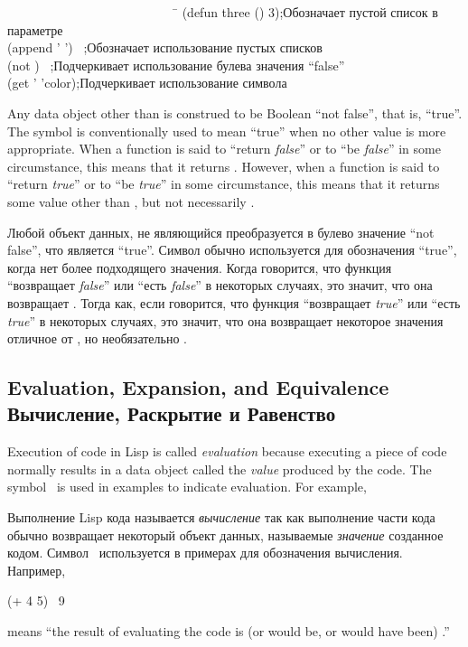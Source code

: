 \begin{lisp}
~~~~~~~~~~~~~~~~~~~~~~~~~~~\=\kill
(defun three () 3)\>;{\rm Обозначает пустой список в параметре} \\
(append '{\empty} '{\empty}) \EV\ {\empty}\>;{\rm Обозначает использование
пустых списков} \\
(not {\false}) \EV\ {\true}\>;{\rm Подчеркивает использование булева значения ``false''} \\
(get '{\nil} 'color)\>;{\rm Подчеркивает использование символа}
\end{lisp}

Any data object other than {\false} is construed to be Boolean
``not false'', that is, ``true''.  The symbol {\true} is conventionally
used to mean ``true'' when no other value is more appropriate.
When a function is said to ``return {\it false}'' or to ``be {\it false}''
in some circumstance, this means that it returns {\false}.
However, when a function is said to ``return {\it true}'' or to ``be {\it true}''
in some circumstance, this means that it returns some value other
than {\false}, but not necessarily {\true}.

Любой объект данных, не являющийся {\false} преобразуется в булево значение
``not false'', что является ``true''. Символ {\true} обычно используется для
обозначения ``true'', когда нет более подходящего значения.
Когда говорится, что функция ``возвращает {\it false}'' или ``есть {\it false}''
в некоторых случаях, это значит, что она возвращает {\false}.
Тогда как, если говорится, что функция ``возвращает {\it true}'' или ``есть {\it
true}'' в некоторых случаях, это значит, что она возвращает некоторое
значения отличное от {\false}, но необязательно {\true}.

\subsection{Evaluation, Expansion, and Equivalence Вычисление, Раскрытие и Равенство}

Execution of code in Lisp is called {\it evaluation} because executing a
piece of code normally results in a data object called the {\it value}
produced by the code.  The symbol \EV\ is used in examples to
indicate evaluation.
For example,

Выполнение Lisp кода называется {\it вычисление} так как выполнение части кода
обычно возвращает некоторый объект данных, называемые {\it значение} созданное
кодом. Символ \EV\ используется в примерах для обозначения вычисления.
Например,
\begin{lisp}
(+ 4 5) \EV\ 9
\end{lisp}
means ``the result of evaluating the code  is (or would be,
or would have been) .'' 

